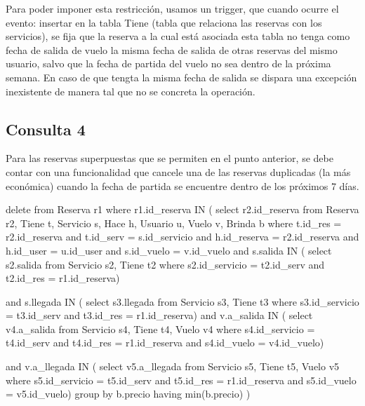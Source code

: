 Para poder imponer esta restricción, usamos un trigger, que cuando ocurre el evento: 
insertar en la tabla Tiene (tabla que relaciona las reservas con los servicios), se fija
que la reserva a la cual está asociada esta tabla no tenga como fecha de salida de vuelo
la misma fecha de salida de otras reservas del mismo usuario, salvo que la fecha de partida
del vuelo no sea dentro de la próxima semana. En caso de que tengta la misma fecha de salida
se dispara una excepción inexistente de manera tal que no se concreta la operación.

\newpage

\subsection*{Consulta 4}

Para las reservas superpuestas que se permiten en el punto anterior, se debe contar con una
funcionalidad que cancele una de las reservas duplicadas (la más económica) cuando la
fecha de partida se encuentre dentro de los próximos 7 días.


\begin{small}
\begin{verbatimtab}[2]
delete
from Reserva r1
where r1.id_reserva IN (
	select r2.id_reserva
	from Reserva r2, Tiene t, Servicio s, Hace h, Usuario u, Vuelo v, Brinda b
	where t.id_res = r2.id_reserva
	and t.id_serv = s.id_servicio
        and h.id_reserva = r2.id_reserva
        and h.id_user = u.id_user
        and s.id_vuelo = v.id_vuelo     
        and s.salida IN (
                select s2.salida
                from Servicio s2, Tiene t2      
                where s2.id_servicio = t2.id_serv 
                and t2.id_res = r1.id_reserva)

        and s.llegada IN ( 
                select s3.llegada
                from Servicio s3, Tiene t3      
                where s3.id_servicio = t3.id_serv 
                and t3.id_res = r1.id_reserva)
        and v.a_salida IN ( 
                select v4.a_salida
                from Servicio s4, Tiene t4, Vuelo v4
                where s4.id_servicio = t4.id_serv 
                and t4.id_res = r1.id_reserva
                and s4.id_vuelo = v4.id_vuelo)

	and v.a_llegada IN ( 
		select v5.a_llegada
		from Servicio s5, Tiene t5, Vuelo v5
		where s5.id_servicio = t5.id_serv
		and t5.id_res = r1.id_reserva
		and s5.id_vuelo = v5.id_vuelo)
	group by b.precio
	having min(b.precio)
)
\end{verbatimtab}
\end{small}


